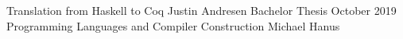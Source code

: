 \documentclass[10pt]{book}
\begin{document}
\frontmatter

\studtitlepage%
  {Translation from Haskell to Coq}
  {}%
  {Justin Andresen}%
  {Bachelor Thesis}%
  {October 2019}%
  {Programming Languages and Compiler Construction}%
  {Michael Hanus}
\cleardoublepage
\eidesstatt



\tableofcontents
\mainmatter








\appendix

\backmatter
\nocite{*} %
\tocbibliography
\end{document}
